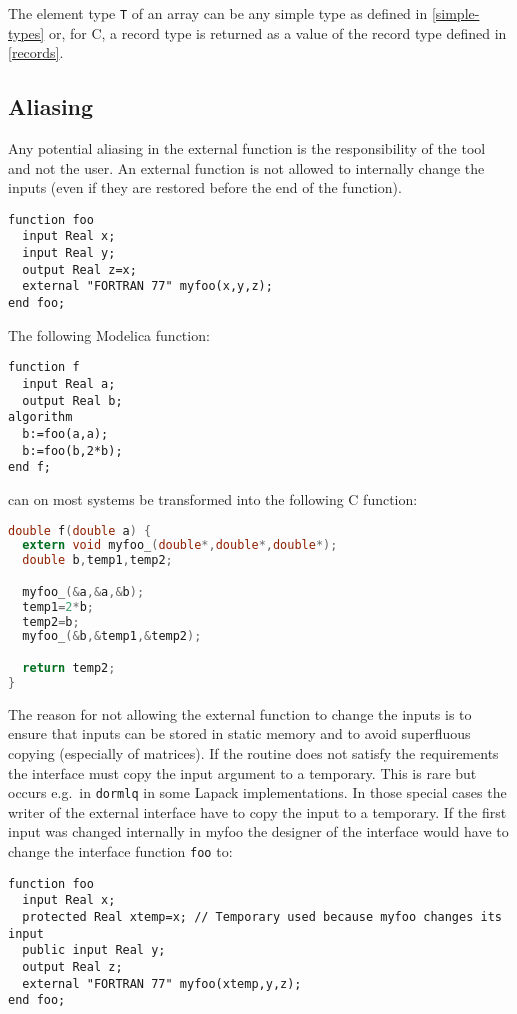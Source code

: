 The element type \lstinline!T! of an array can be any simple type as defined in
\cref{simple-types} or, for C, a record type is returned as a value of the
record type defined in \cref{records}.

\subsection{Aliasing}\label{aliasing}

Any potential aliasing in the external function is the responsibility of
the tool and not the user. An external function is not allowed to
internally change the inputs (even if they are restored before the end
of the function).

\begin{example}
\begin{lstlisting}[language=modelica]
function foo
  input Real x;
  input Real y;
  output Real z=x;
  external "FORTRAN 77" myfoo(x,y,z);
end foo;
\end{lstlisting}
The following Modelica function:
\begin{lstlisting}[language=modelica]
function f
  input Real a;
  output Real b;
algorithm
  b:=foo(a,a);
  b:=foo(b,2*b);
end f;
\end{lstlisting}
can on most systems be transformed into the following C function:
\begin{lstlisting}[language=C]
double f(double a) {
  extern void myfoo_(double*,double*,double*);
  double b,temp1,temp2;

  myfoo_(&a,&a,&b);
  temp1=2*b;
  temp2=b;
  myfoo_(&b,&temp1,&temp2);

  return temp2;
}
\end{lstlisting}

The reason for not allowing the external function to change the
inputs is to ensure that inputs can be stored in static memory and to
avoid superfluous copying (especially of matrices). If the routine does
not satisfy the requirements the interface must copy the input argument
to a temporary. This is rare but occurs e.g.\ in \lstinline!dormlq! in some
Lapack implementations. In those special cases the writer of the
external interface have to copy the input to a temporary. If the first
input was changed internally in myfoo the designer of the interface
would have to change the interface function \lstinline!foo! to:
\begin{lstlisting}[language=modelica]
function foo
  input Real x;
  protected Real xtemp=x; // Temporary used because myfoo changes its input
  public input Real y;
  output Real z;
  external "FORTRAN 77" myfoo(xtemp,y,z);
end foo;
\end{lstlisting}


\end{example}
